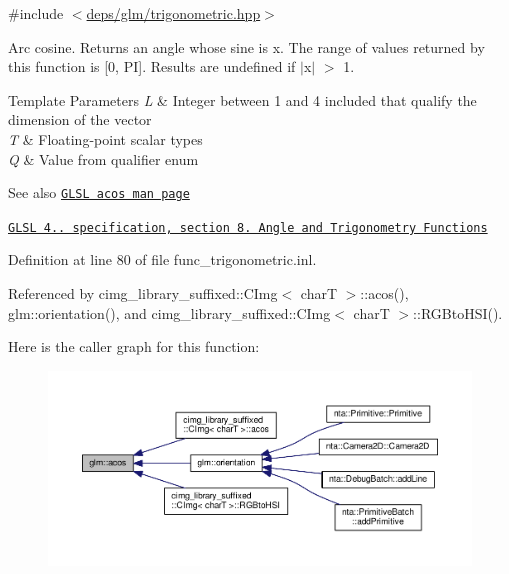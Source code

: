 {\ttfamily \#include $<$\hyperlink{trigonometric_8hpp}{deps/glm/trigonometric.\+hpp}$>$}

Arc cosine. Returns an angle whose sine is x. The range of values returned by this function is \mbox{[}0, PI\mbox{]}. Results are undefined if $\vert$x$\vert$ $>$ 1.


\begin{DoxyTemplParams}{Template Parameters}
{\em L} & Integer between 1 and 4 included that qualify the dimension of the vector \\
\hline
{\em T} & Floating-\/point scalar types \\
\hline
{\em Q} & Value from qualifier enum\\
\hline
\end{DoxyTemplParams}
\begin{DoxySeeAlso}{See also}
\href{http://www.opengl.org/sdk/docs/manglsl/xhtml/acos.xml}{\tt G\+L\+SL acos man page} 

\href{http://www.opengl.org/registry/doc/GLSLangSpec.4.20.8.pdf}{\tt G\+L\+SL 4.. specification, section 8. Angle and Trigonometry Functions} 
\end{DoxySeeAlso}


Definition at line 80 of file func\+\_\+trigonometric.\+inl.



Referenced by cimg\+\_\+library\+\_\+suffixed\+::\+C\+Img$<$ char\+T $>$\+::acos(), glm\+::orientation(), and cimg\+\_\+library\+\_\+suffixed\+::\+C\+Img$<$ char\+T $>$\+::\+R\+G\+Bto\+H\+S\+I().

Here is the caller graph for this function\+:
\nopagebreak
\begin{figure}[H]
\begin{center}
\leavevmode
\includegraphics[width=350pt]{dc/d43/group__core__func__trigonometric_gacc9b092df8257c68f19c9053703e2563_icgraph}
\end{center}
\end{figure}
\mbox{\label{group__core__func__trigonometric_ga858f35dc66fd2688f20c52b5f25be76a}} 

